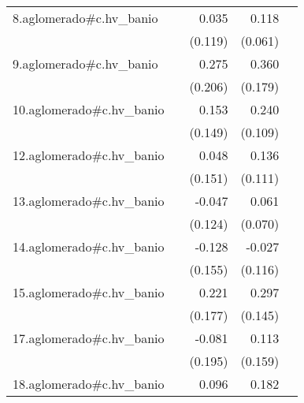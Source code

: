 {\begin{longtable}{l*{4}{D{.}{.}{-1}}}
\addlinespace
8.aglomerado#c.hv\_banio&                     &       0.035         &       0.118         &                     \\
            &                     &     (0.119)         &     (0.061)         &                     \\
\addlinespace
9.aglomerado#c.hv\_banio&                     &       0.275         &       0.360\sym{*}  &                     \\
            &                     &     (0.206)         &     (0.179)         &                     \\
\addlinespace
10.aglomerado#c.hv\_banio&                     &       0.153         &       0.240\sym{*}  &                     \\
            &                     &     (0.149)         &     (0.109)         &                     \\
\addlinespace
12.aglomerado#c.hv\_banio&                     &       0.048         &       0.136         &                     \\
            &                     &     (0.151)         &     (0.111)         &                     \\
\addlinespace
13.aglomerado#c.hv\_banio&                     &      -0.047         &       0.061         &                     \\
            &                     &     (0.124)         &     (0.070)         &                     \\
\addlinespace
14.aglomerado#c.hv\_banio&                     &      -0.128         &      -0.027         &                     \\
            &                     &     (0.155)         &     (0.116)         &                     \\
\addlinespace
15.aglomerado#c.hv\_banio&                     &       0.221         &       0.297\sym{*}  &                     \\
            &                     &     (0.177)         &     (0.145)         &                     \\
\addlinespace
17.aglomerado#c.hv\_banio&                     &      -0.081         &       0.113         &                     \\
            &                     &     (0.195)         &     (0.159)         &                     \\
\addlinespace
18.aglomerado#c.hv\_banio&                     &       0.096         &       0.182\sym{**} &                     \\

\end{longtable}}
